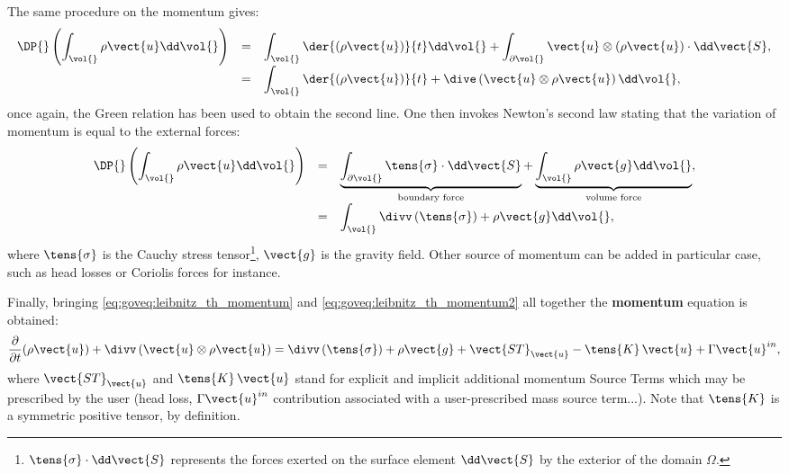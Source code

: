 The same procedure on the momentum gives:
\begin{equation}\label{eq:goveq:leibnitz_th_momentum}
\begin{array}{r c l}
\displaystyle \DP{} \left( \int_{\vol{} }\rho \vect{u} \dd \vol{}\right) &=& 
\displaystyle \int_{\vol{} }\der{\left( \rho \vect{u} \right) }{t} \dd \vol{} + \int_{\partial \vol{}}  \vect{u}\otimes \left( \rho \vect{u} \right) \cdot  \dd \vect{S}, \\
\displaystyle &=&
\displaystyle \int_{\vol{ }} \der{\left( \rho \vect{u} \right) }{t} + \dive \left( \vect{u} \otimes \rho \vect{u} \right)  \dd \vol{},
\end{array}
 \end{equation} 
once again, the Green relation has been used to obtain the second line. One then invokes Newton's second law
stating that the variation of momentum is equal to the external forces:
\begin{equation}\label{eq:goveq:leibnitz_th_momentum2}
\begin{array}{r c l}
\displaystyle \DP{} \left( \int_{\vol{}} \rho \vect{u} \dd \vol{}\right) &=& 
\displaystyle 
\underbrace{
\int_{\partial \vol{}}  \tens{\sigma} \cdot  \dd \vect{S}
}_{
\text{ boundary force }
}
+
\underbrace{
\int_{\vol{} }\rho \vect{g} \dd \vol{}
}_{
\text{ volume force }
}
, \\
\displaystyle &=&
\displaystyle \int_{\vol{ }} \divv \left( \tens{\sigma} \right) + \rho \vect{g}  \dd \vol{},
\end{array}
 \end{equation} 
where $\tens{\sigma}$ is the Cauchy stress tensor\footnote{
$\tens{\sigma} \cdot \dd \vect{S}$ represents the forces exerted on the surface element
$ \dd \vect{S} $ by the exterior of the domain $\Omega$.
}, $\vect{g}$ is the gravity field. Other source of momentum can be added in particular case, such 
as head losses or Coriolis forces for instance.

Finally, bringing \eqref{eq:goveq:leibnitz_th_momentum} and \eqref{eq:goveq:leibnitz_th_momentum2} all together 
the \textbf{momentum} equation is obtained:
\begin{equation}\label{eq:momentum}
\dfrac{\partial }{\partial t}(\rho \vect{u})
+\divv \left( \vect{u}\otimes \rho \vect{u} \right)
=\divv \left( \tens{\sigma} \right) +\rho \vect{g} +\vect{ST}_{\vect{u}}-\tens{K}\,\vect{u} + \Gamma \vect{u}^{in},
\end{equation}
%
where $\vect{ST}_{\vect{u}}$ and $\tens{K}\,\vect{u}$ stand for explicit and implicit additional 
momentum Source Terms
 which may be prescribed by the user (head loss, $\Gamma \vect{u}^{in}$ 
contribution associated with a user-prescribed mass source term...).
Note that $\tens{K}$ is a symmetric positive tensor, by definition. 


